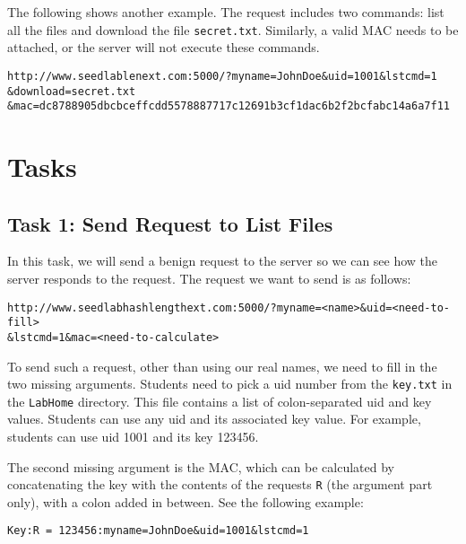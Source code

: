 The following shows another example. The request includes 
two commands: list all the files and download the 
file \texttt{secret.txt}. Similarly, a valid MAC needs to be attached, 
or the server will not execute these commands.  

\begin{lstlisting}
http://www.seedlablenext.com:5000/?myname=JohnDoe&uid=1001&lstcmd=1
&download=secret.txt
&mac=dc8788905dbcbceffcdd5578887717c12691b3cf1dac6b2f2bcfabc14a6a7f11
\end{lstlisting}



\section{Tasks}


\subsection{Task 1: Send Request to List Files}

In this task, we will send a benign request to the server so we
can see how the server responds to the request. The request we want to send
is as follows:

\begin{lstlisting}
http://www.seedlabhashlengthext.com:5000/?myname=<name>&uid=<need-to-fill>
&lstcmd=1&mac=<need-to-calculate>
\end{lstlisting}

To send such a request, other than using our real names, we need to fill in the 
two missing arguments. Students need
to pick a uid number from the \texttt{key.txt} in the \texttt{LabHome}
directory. This file contains a list of colon-separated uid and key values. Students
can use any uid and its associated key value. For example, students can use uid
1001 and its key 123456.

The second missing argument is the MAC, which can be calculated by
concatenating the key with the contents of the requests \texttt{R} 
(the argument part only), with a colon added in between. 
See the following example:
 
\begin{lstlisting}
Key:R = 123456:myname=JohnDoe&uid=1001&lstcmd=1
\end{lstlisting}
 
